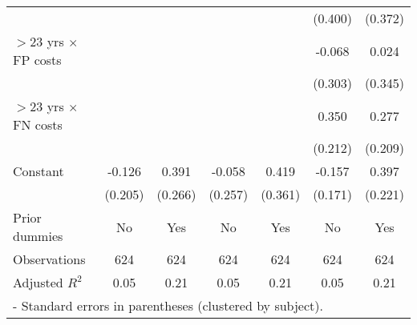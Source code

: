 \begin{table}[htbp]
\begin{tabular}{l*{6}{c}}
                &         &         &         &         &  (0.400)&  (0.372)\\
$>$23 yrs $\times$ FP costs&         &         &         &         &   -0.068&    0.024\\
                &         &         &         &         &  (0.303)&  (0.345)\\
$>$23 yrs $\times$ FN costs&         &         &         &         &    0.350&    0.277\\
                &         &         &         &         &  (0.212)&  (0.209)\\
Constant        &   -0.126&    0.391&   -0.058&    0.419&   -0.157&    0.397\\
                &  (0.205)&  (0.266)&  (0.257)&  (0.361)&  (0.171)&  (0.221)\\
Prior dummies   &       No&      Yes&       No&      Yes&       No&      Yes\\
\hline
Observations    &      624&      624&      624&      624&      624&      624\\
Adjusted \(R^{2}\)&     0.05&     0.21&     0.05&     0.21&     0.05&     0.21\\
\hline\hline
\multicolumn{7}{l}{\footnotesize * - Standard errors in parentheses (clustered by subject).}\\
\end{tabular}
\end{table}

